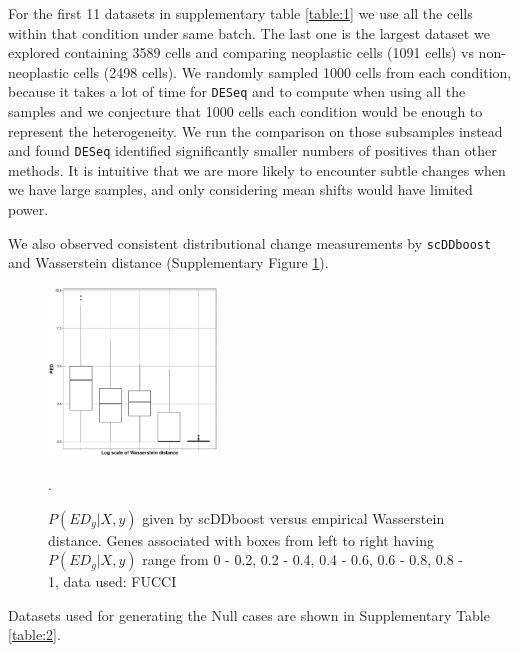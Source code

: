 \documentclass[aoas,preprint]{imsart}
\begin{document}
For the first 11 datasets in supplementary table \ref{table:1} we use all the cells within that condition under same batch.
The last one is the largest dataset we explored containing 3589 cells and comparing neoplastic cells (1091 cells) vs non-neoplastic cells (2498 cells).
We randomly sampled 1000 cells from each condition, because it takes a lot of time for \texttt{DESeq} and  to compute when using all the samples
and we conjecture that 1000 cells each condition would be enough to represent the heterogeneity. %
We run the comparison on those subsamples instead 
and found \texttt{DESeq} identified significantly smaller numbers of positives than other methods. It is intuitive that we are more likely to encounter subtle changes
when we have large samples, and only considering mean shifts would have limited power. 

We also observed consistent distributional change measurements by \texttt{scDDboost} and Wasserstein distance 
(Supplementary Figure \ref{fig:wad}).

\begin{figure}[h!]
\includegraphics[width = 0.4\textwidth]{Figs/Fucci_wadist.pdf}
\caption{$P(ED_g|X,y)$ given by scDDboost versus empirical Wasserstein distance. 
Genes associated with boxes from left to right having $P(ED_g|X,y)$ range from 0 - 0.2, 0.2 - 0.4, 0.4 - 0.6, 0.6 - 0.8, 0.8 - 1, data used: FUCCI}.
 \label{fig:wad}
\end{figure}






Datasets used for generating the Null cases  are shown in Supplementary Table \ref{table:2}.
\end{document}

